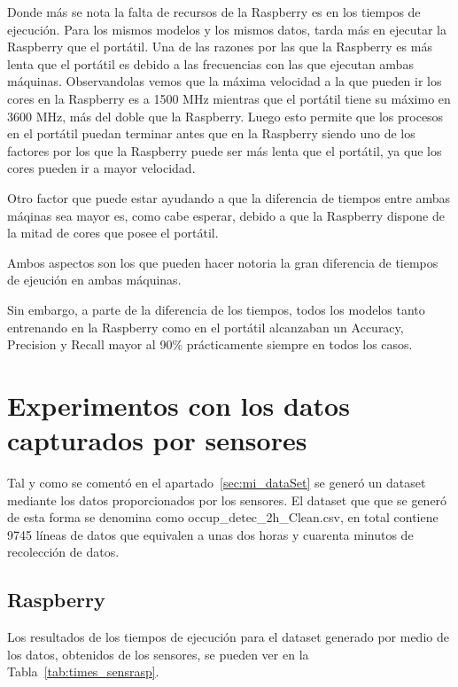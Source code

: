 \documentclass[a4paper, 12pt]{book}
\begin{document}
Donde más se nota la falta de recursos de la Raspberry es en los tiempos de ejecución. Para los mismos modelos y los mismos datos, tarda más en ejecutar la Raspberry que el portátil. Una de las razones por las que la Raspberry es más lenta que el portátil es debido a las frecuencias con las que ejecutan ambas máquinas. Observandolas vemos que la máxima velocidad a la que pueden ir los cores en la Raspberry es a 1500 MHz mientras que el portátil tiene su máximo en 3600 MHz, más del doble que la Raspberry. Luego esto permite que los procesos en el portátil puedan terminar antes que en la Raspberry siendo uno de los factores por los que la Raspberry puede ser más lenta que el portátil, ya que los cores pueden ir a mayor velocidad.

Otro factor que puede estar ayudando a que la diferencia de tiempos entre ambas máqinas sea mayor es, como cabe esperar, debido a que la Raspberry dispone de la mitad de cores que posee el portátil.

Ambos aspectos son los que pueden hacer notoria la gran diferencia de tiempos de ejeución en ambas máquinas.

Sin embargo, a parte de la diferencia de los tiempos, todos los modelos tanto entrenando en la Raspberry como en el portátil alcanzaban un Accuracy, Precision y Recall mayor al 90\% prácticamente siempre en todos los casos.

\section{Experimentos con los datos capturados por sensores}
\label{sec:exp_dSensados}

Tal y como se comentó en el apartado~\ref{sec:mi_dataSet} se generó un dataset mediante los datos proporcionados por los sensores. El dataset que que se generó de esta forma se denomina como occup\_detec\_2h\_Clean.csv, en total contiene 9745 líneas de datos que equivalen a unas dos horas y cuarenta minutos de recolección de datos.

\subsection{Raspberry}
\label{subsec:rasp_sensados}

Los resultados de los tiempos de ejecución para el dataset generado por medio de los datos, obtenidos de los sensores, se pueden ver en la Tabla~\ref{tab:times_sensrasp}.
\end{document}
